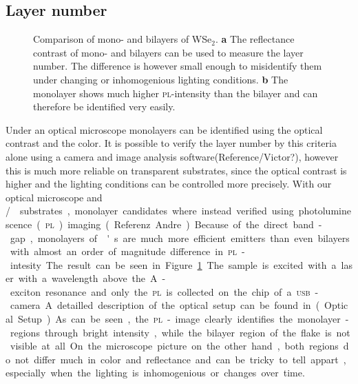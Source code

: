 \subsection{Layer number}

\begin{figure}
	\centering
	\begin{subfigure}{0.4\textwidth}
	\end{subfigure}
	\begin{subfigure}{0.4\textwidth}
	\end{subfigure}
	\caption{Comparison of mono- and bilayers of WSe$_2$. \textbf{a} The reflectance contrast of mono- and bilayers can be used to measure the layer number. The difference is however small enough to misidentify them under changing or inhomogenious lighting conditions. \textbf{b} The monolayer shows much higher \textsc{pl}-intensity than the bilayer and can therefore be identified very easily.}
	\label{pl-contrast}
\end{figure}

Under an optical microscope monolayers can be identified using the optical contrast and the color. It is possible to verify the layer number by this criteria alone using a camera and image analysis software(Reference/Victor?), however this is much more reliable on transparent substrates, since the optical contrast is higher and the lighting conditions can be controlled more precisely. With our optical microscope and \si/\sio substrates, monolayer candidates where instead verified using photoluminescence (\textsc{pl}) imaging(Referenz Andre). Because of the direct band-gap, monolayers of \tmd's are much more efficient emitters than even bilayers with almost an order of magnitude difference in \textsc{pl}-intesity. The result can be seen in Figure \ref{pl-contrast}. The sample is excited with a laser with a wavelength above the A-exciton resonance and only the \textsc{pl} is collected on the chip of a \textsc{usb}-camera. A detailled description of the optical setup can be found in (Optical Setup). As can be seen, the \textsc{pl}-image clearly identifies the monolayer-regions through bright intensity, while the bilayer region of the flake is not visible at all. On the microscope picture on the other hand, both regions do not differ much in color and reflectance and can be tricky to tell appart, especially when the lighting is inhomogenious or changes over time.

